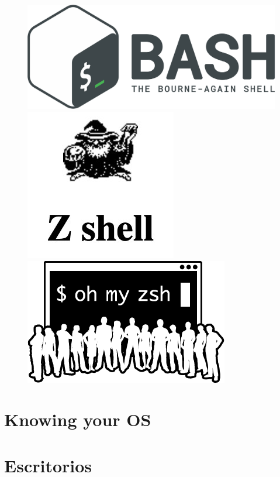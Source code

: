\begin{figure}[ht!]
	\centering
	\includegraphics[width=0.2\paperwidth]{./img/bash}
	\includegraphics[width=0.2\paperwidth]{./img/zshell}
	\includegraphics[width=0.2\paperwidth]{./img/ohmyzsh}
\end{figure}


\section{Knowing your OS}

\section{Escritorios}

